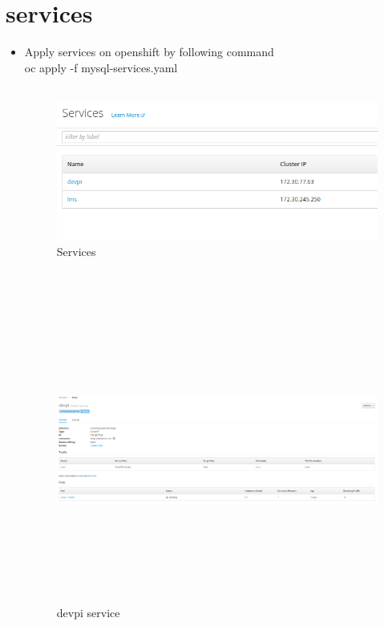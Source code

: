 \documentclass[11pt]{report}
\begin{document}
	\section{services}
	\begin{itemize}
		\item Apply services on openshift by following command
		\\
		oc apply -f mysql-services.yaml
		\ \\
		\ \\
		\begin{figure}[h!]
    	\begin{center}
    	   				\includegraphics[scale=0.5]{servicelist.png}
    		\caption{Services}
    	  \end{center}
	  
	\end{figure}
		
		\ \\
		
			\begin{figure}[h!]
    	\begin{center}
    	   				\includegraphics[width=16cm,height=10cm]{servicexample.png}
    		\caption{devpi service}
    	  \end{center}
	  
	\end{figure}
		\vspace{1cm}
	\	\\
	\end{itemize}
\end{document}
